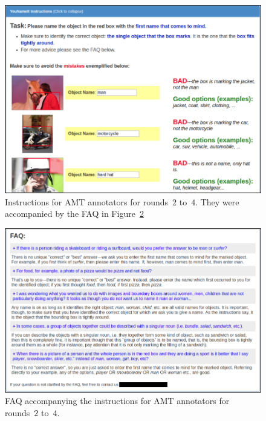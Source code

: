 \begin{figure}[htp]
  \centering
  \includegraphics[width=1.5\columnwidth]{figures/round1+_p1.png}
  \caption{Instructions for AMT annotators for rounds~$2$ to~$4$. They were accompanied by the FAQ in Figure~\ref{fig:faq}}
  \label{fig:instructions2}
\end{figure}
%
\begin{figure}[htp]
  \centering
  \includegraphics[width=1.5\columnwidth]{figures/round1+_p2.png}
  \caption{FAQ accompanying the instructions for AMT annotators for rounds~$2$ to~$4$.}
  \label{fig:faq}
\end{figure}





